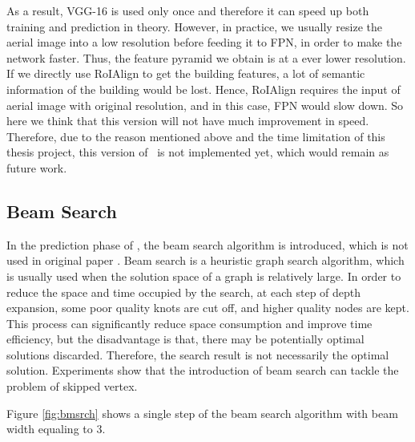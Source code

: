 

As a result, VGG-16 is used only once and therefore it can speed up both training and prediction in theory. However, in practice, we usually resize the aerial image into a low resolution before feeding it to FPN, in order to make the network faster. Thus, the feature pyramid we obtain is at a ever lower resolution. If we directly use RoIAlign to get the building features, a lot of semantic information of the building would be lost. Hence, RoIAlign requires the input of aerial image with original resolution, and in this case, FPN would slow down. So here we think that this version will not have much improvement in speed. Therefore, due to the reason mentioned above and the time limitation of this thesis project, this version of \modelnameshort\ is not implemented yet, which would remain as future work. 

\subsection{Beam Search}\label{bmsrch}
In the prediction phase of \modelnameshort, the beam search algorithm is introduced, which is not used in original paper \cite{polygonrnn}. Beam search is a heuristic graph search algorithm, which is usually used when the solution space of a graph is relatively large. In order to reduce the space and time occupied by the search, at each step of depth expansion, some poor quality knots are cut off, and higher quality nodes are kept. This process can significantly reduce space consumption and improve time efficiency, but the disadvantage is that, there may be potentially optimal solutions discarded. Therefore, the search result is not necessarily the optimal solution. Experiments show that the introduction of beam search can tackle the problem of skipped vertex.

Figure \ref{fig:bmsrch} shows a single step of the beam search algorithm with beam width equaling to 3.





